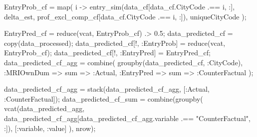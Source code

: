 \documentclass[
  letterpaper,
  DIV=11,
  numbers=noendperiod]{scrreprt}
\newenvironment{Shaded}{\begin{snugshade}}{\end{snugshade}}
\newcommand{\FloatTok}[1]{\textcolor[rgb]{0.68,0.00,0.00}{#1}}
\newcommand{\FunctionTok}[1]{\textcolor[rgb]{0.28,0.35,0.67}{#1}}
\newcommand{\NormalTok}[1]{\textcolor[rgb]{0.00,0.23,0.31}{#1}}
\newcommand{\OperatorTok}[1]{\textcolor[rgb]{0.37,0.37,0.37}{#1}}
\newcommand{\StringTok}[1]{\textcolor[rgb]{0.13,0.47,0.30}{#1}}
\begin{document}
\begin{Shaded}
\begin{Highlighting}[]
\NormalTok{EntryProb\_cf }\OperatorTok{=} \FunctionTok{map}\NormalTok{(}
\NormalTok{    i }\OperatorTok{{-}\textgreater{}} \FunctionTok{entry\_sim}\NormalTok{(data\_cf[data\_cf.CityCode }\OperatorTok{.==}\NormalTok{ i, }\OperatorTok{:}\NormalTok{], delta\_est, prof\_excl\_comp\_cf[data\_cf.CityCode }\OperatorTok{.==}\NormalTok{ i, }\OperatorTok{:}\NormalTok{]), }
\NormalTok{    uniqueCityCode}
\NormalTok{);}
\end{Highlighting}
\end{Shaded}

\begin{Shaded}
\begin{Highlighting}[]
\NormalTok{EntryPred\_cf }\OperatorTok{=} \FunctionTok{reduce}\NormalTok{(vcat, EntryProb\_cf) }\OperatorTok{.\textgreater{}} \FloatTok{0.5}\NormalTok{;}
\NormalTok{data\_predicted\_cf }\OperatorTok{=} \FunctionTok{copy}\NormalTok{(data\_processed);}
\NormalTok{data\_predicted\_cf[!, }\OperatorTok{:}\NormalTok{EntryProb] }\OperatorTok{=} \FunctionTok{reduce}\NormalTok{(vcat, EntryProb\_cf);}
\NormalTok{data\_predicted\_cf[!, }\OperatorTok{:}\NormalTok{EntryPred] }\OperatorTok{=}\NormalTok{ EntryPred\_cf;}
\NormalTok{data\_predicted\_cf\_agg }\OperatorTok{=} \FunctionTok{combine}\NormalTok{(}
    \FunctionTok{groupby}\NormalTok{(data\_predicted\_cf, }\OperatorTok{:}\NormalTok{CityCode),}
    \OperatorTok{:}\NormalTok{MRIOwnDum }\OperatorTok{=\textgreater{}}\NormalTok{ sum }\OperatorTok{=\textgreater{}} \OperatorTok{:}\NormalTok{Actual,}
    \OperatorTok{:}\NormalTok{EntryPred }\OperatorTok{=\textgreater{}}\NormalTok{ sum }\OperatorTok{=\textgreater{}} \OperatorTok{:}\NormalTok{CounterFactual}
\NormalTok{);}

\NormalTok{data\_predicted\_cf\_agg }\OperatorTok{=} \FunctionTok{stack}\NormalTok{(data\_predicted\_cf\_agg, [}\OperatorTok{:}\NormalTok{Actual, }\OperatorTok{:}\NormalTok{CounterFactual]);}
\NormalTok{data\_predicted\_cf\_sum }\OperatorTok{=} \FunctionTok{combine}\NormalTok{(}\FunctionTok{groupby}\NormalTok{(}
    \FunctionTok{vcat}\NormalTok{(data\_predicted\_agg, data\_predicted\_cf\_agg[data\_predicted\_cf\_agg.variable }\OperatorTok{.==} \StringTok{"CounterFactual"}\NormalTok{, }\OperatorTok{:}\NormalTok{]),}
\NormalTok{    [}\OperatorTok{:}\NormalTok{variable, }\OperatorTok{:}\NormalTok{value]}
\NormalTok{    ), nrow);}


\end{Highlighting}
\end{Shaded}
\end{document}
